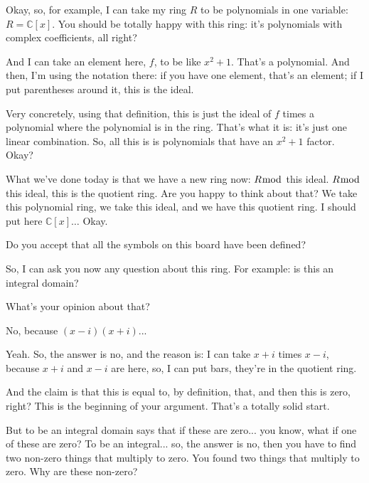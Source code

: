\begin{speech}[01:14:41 - 01:16:10]
Okay, so, for example, I can take my ring $R$ to be polynomials in one variable:  $R = \mathbb{C}[x]$. You should be totally happy with this ring: it's polynomials with complex coefficients, all right? 

And I can take an element here, $f$, to be like $x^2 + 1$.  That's a polynomial. And then, I'm using the notation there: if you have one element, that's an element; if I put parentheses around it, this is the ideal.  

Very concretely, using that definition, this is just the ideal of $f$ times a polynomial where the polynomial is in the ring.  That's what it is: it's just one linear combination. So, all this is is polynomials that have an $x^2 + 1$ factor. Okay? 

What we've done today is that we have a new ring now: $R \bmod$ this ideal.  $R \bmod$ this ideal, this is the quotient ring. Are you happy to think about that? We take this polynomial ring, we take this ideal, and we have this quotient ring. I should put here $\mathbb{C}[x] \dots$  Okay. 

Do you accept that all the symbols on this board have been defined?
\end{speech}

\begin{speech}[01:16:10 - 01:16:41]
So, I can ask you now any question about this ring. For example: is this an integral domain? 

What's your opinion about that?
\end{speech}

\begin{student}
No, because $(x - i)(x + i)$...
\end{student}

\begin{speech}[01:16:43 - 01:17:31]
Yeah. So, the answer is no,  and the reason is: I can take $x + i$ times $x - i$, because $x + i$ and $x - i$ are here, so, I can put bars, they're in the quotient ring.  

And the claim is that this is equal to, by definition, that,  and then this is zero,  right? This is the beginning of your argument. That's a totally solid start.

But to be an integral domain says that if these are zero... you know, what if one of these are zero? To be an integral... so, the answer is no, then you have to find two non-zero things that multiply to zero. You found two things that multiply to zero. Why are these non-zero?
\end{speech}

